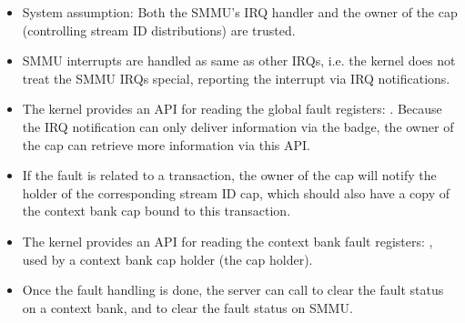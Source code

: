 \begin{itemize}
\item System assumption: Both the SMMU's IRQ handler and the owner of the
     cap (controlling stream ID distributions) are trusted.
\item SMMU interrupts are handled as same as other IRQs, i.e. the kernel does not
    treat the SMMU IRQs special, reporting the interrupt via IRQ notifications.
\item The kernel provides an API for reading the global fault registers:
    . Because
    the IRQ notification can only deliver information via the badge, the owner
    of the  cap can retrieve more information via this API.
\item If the fault is related to a transaction, the owner of the
     cap will notify the holder of the corresponding
    stream ID cap, which should also have a copy of the context bank cap bound to
    this transaction.
\item The kernel provides an API for reading the context bank fault registers:
    , used by a context bank
    cap holder (the  cap holder).
\item Once the fault handling is done, the server can call
     to clear the fault
    status on a context bank, and
    to clear the fault status on SMMU.
\end{itemize}

